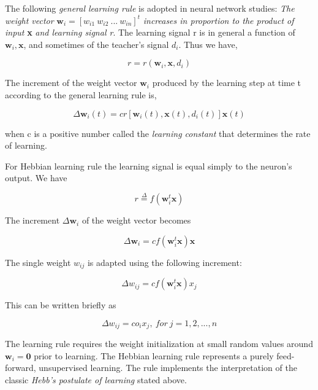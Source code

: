 The following \textit{general learning rule} is adopted in neural network studies: \textit{The weight vector} \( \textbf{w}_i = [w_{i1} \> w_{i2} \> ... \> w_{in}]^t \) \textit{increases in proportion to the product of input} \textbf{x} \textit{and learning signal r}. The learning signal r is in general a function of \(\textbf{w}_i,\textbf{x}\), and sometimes of the teacher's signal \(d_i\). Thus we have, 

\begin{equation}
	r = r(\textbf{w}_i,\textbf{x},d_i)
\end{equation}

The increment of the weight vector \(\textbf{w}_i\) produced by the learning step at time t according to the general learning rule is,

\begin{equation}
	\Delta\textbf{w}_i(t)=cr[\textbf{w}_i(t),\textbf{x}(t),d_i(t)]\textbf{x}(t)
\end{equation}

when c is a positive number called the \textit{learning constant} that determines the rate of learning.

For Hebbian learning rule the learning signal is equal simply to the neuron's output. We have

\begin{equation}
	r \overset{\Delta}{=} f(\textbf{w}_i^t \textbf{x})
\end{equation}


The increment \(\Delta\textbf{w}_i\) of the weight vector becomes

\begin{equation}
	\Delta\textbf{w}_i = cf(\textbf{w}_i^t \textbf{x})\textbf{x}
\end{equation}

The single weight \( w_{ij} \) is adapted using the following increment:

\begin{equation}
	\Delta\textit{w}_{ij} = cf(\textbf{w}_i^t \textbf{x})x_j
\end{equation}

This can be written briefly as 

\begin{equation}
	\Delta\textit{w}_{ij} = c o_i x_j, \> for \> j = 1, 2, ..., n
\end{equation}

The learning rule requires the weight initialization at small random values around \( \textbf{w}_i = \textbf{0}\) prior to learning. The Hebbian learning rule represents a purely feed-forward, unsupervised learning. The rule implements the interpretation of the classic \textit{Hebb's postulate of learning} stated above. 

